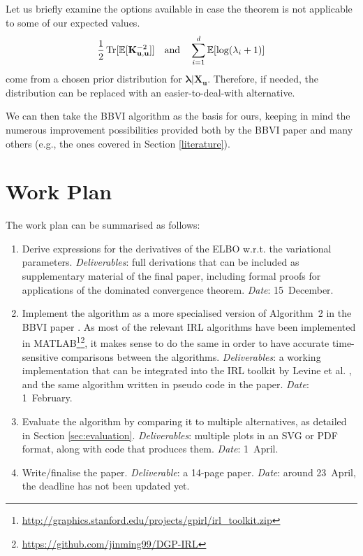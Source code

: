 \documentclass{mprop}
\theoremstyle{definition}
\DeclareMathOperator{\Tr}{Tr}
\begin{document}
Let us briefly examine the options available in case the theorem is not
applicable to some of our expected values.
\[ \frac{1}{2}\Tr[\mathbb{E}[\Kuu^{-2}]] \quad \text{and} \quad \sum_{i=1}^d
  \mathbb{E}[\log(\lambda_i + 1)] \]
come from a chosen prior distribution for $\bm\lambda | \mathbf{X_u}$.
Therefore, if needed, the distribution can be replaced with an
easier-to-deal-with alternative.



We can then take the BBVI algorithm as
the basis for ours, keeping in mind the numerous improvement possibilities
provided both by the BBVI paper \cite{DBLP:conf/aistats/RanganathGB14} and many
others (e.g., the ones covered in Section \ref{literature}).

\section{Work Plan}

The work plan can be summarised as follows:
\begin{enumerate}
\item Derive expressions for the derivatives of the ELBO w.r.t. the variational
  parameters. \emph{Deliverables}: full derivations that can be included as
  supplementary material of the final paper, including formal proofs for
  applications of the dominated convergence theorem. \emph{Date}: 15~December.
\item Implement the algorithm as a more specialised version of Algorithm~2 in
  the BBVI paper \cite{DBLP:conf/aistats/RanganathGB14}. As most of the relevant
  IRL algorithms have been implemented in
  MATLAB\footnote{\url{http://graphics.stanford.edu/projects/gpirl/irl_toolkit.zip}}\footnote{\url{https://github.com/jinming99/DGP-IRL}},
  it makes sense to do the same in order to have accurate time-sensitive
  comparisons between the algorithms. \emph{Deliverables}: a working
  implementation that can be integrated into the IRL toolkit by Levine et al.
  \cite{DBLP:conf/nips/LevinePK11}, and the same algorithm written in pseudo
  code in the paper. \emph{Date}: 1~February.
\item Evaluate the algorithm by comparing it to multiple alternatives, as
  detailed in Section \ref{sec:evaluation}. \emph{Deliverables}: multiple plots
  in an SVG or PDF format, along with code that produces them. \emph{Date}:
  1~April.
\item Write/finalise the paper. \emph{Deliverable}: a 14-page paper.
  \emph{Date}: around 23~April, the deadline has not been updated yet.
\end{enumerate}
\end{document}
